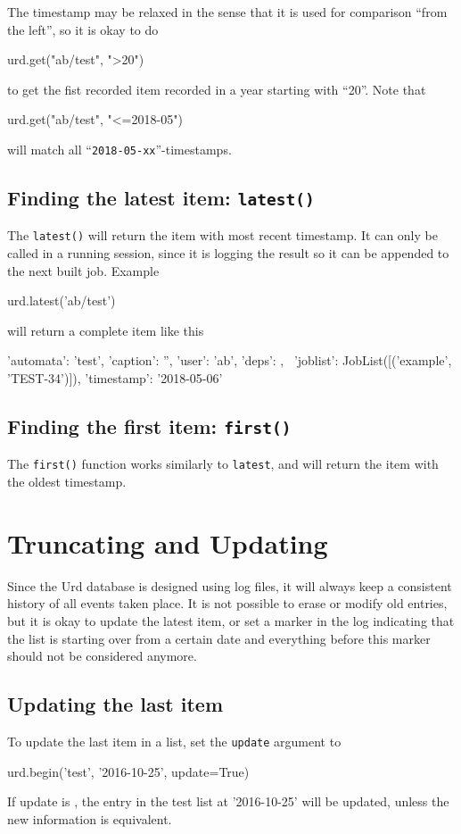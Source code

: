 The timestamp may be relaxed in the sense that it is used for
comparison ``from the left'', so it is okay to do
\begin{python}
urd.get("ab/test", ">20")
\end{python}
to get the fist recorded item recorded in a year starting with ``20''.
Note that
\begin{python}
urd.get("ab/test", "<=2018-05")
\end{python}
will match all ``\texttt{2018-05-xx}''-timestamps.


\subsection{Finding the latest item:  \texttt{latest()}}
The \texttt{latest()} will return the item with most recent timestamp.
It can only be called in a running session, since it is logging the
result so it can be appended to the next built job.  Example
\begin{python}
urd.latest('ab/test')
\end{python}
will return a complete item like this
\begin{shell}
{'automata': 'test', 'caption': '', 'user': 'ab', 'deps': {}, \
 'joblist': JobList([('example', 'TEST-34')]), 'timestamp': '2018-05-06'}
\end{shell}


\subsection{Finding the first item:  \texttt{first()}}
The \texttt{first()} function works similarly to \texttt{latest}, and
will return the item with the oldest timestamp.



\section{Truncating and Updating}
\label{sec:trunc-update}
Since the Urd database is designed using log files, it will always
keep a consistent history of all events taken place.  It is not
possible to erase or modify old entries, but it is okay to update the
latest item, or set a marker in the log indicating that the list is
starting over from a certain date and everything before this marker
should not be considered anymore.

\subsection{Updating the last item}
To update the last item in a list, set the \texttt{update} argument
to \pyTrue
\begin{python}
urd.begin('test', '2016-10-25', update=True)
\end{python}
If update is \pyTrue, the entry in the test list at '2016-10-25' will
be updated, unless the new information is equivalent.

